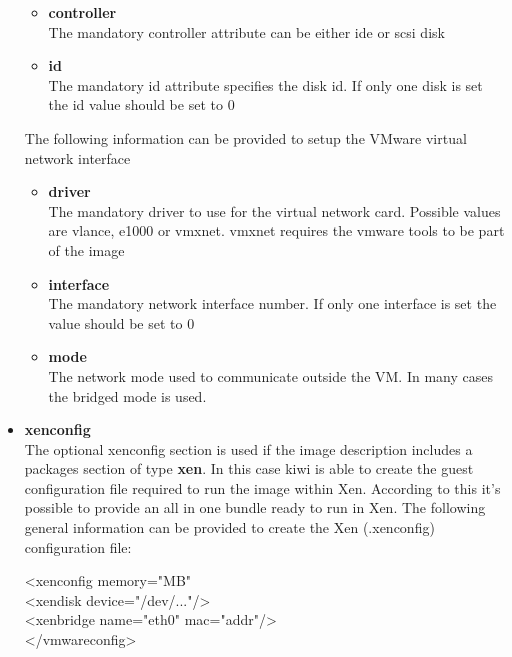 \begin{itemize}
	\begin{itemize}
	\item \textbf{controller}\\
      The mandatory controller attribute can be either ide or scsi disk
	\item \textbf{id}\\
      The mandatory id attribute specifies the disk id. If only one
      disk is set the id value should be set to 0 
	\end{itemize}

	The following information can be provided to setup the VMware virtual
	network interface

	\begin{itemize}
	\item \textbf{driver}\\
      The mandatory driver to use for the virtual network card. Possible
      values are vlance, e1000 or vmxnet. vmxnet requires the vmware tools to be
      part of the image
	\item \textbf{interface}\\
      The mandatory network interface number. If only one interface is
      set the value should be set to 0
	\item \textbf{mode}\\
      The network mode used to communicate outside the VM. In many cases
      the bridged mode is used.
	\end{itemize}

\item \textbf{xenconfig}\\
	The optional xenconfig section is used if the image description
	includes a packages section of type \textbf{xen}. In this case kiwi
	is able to create the guest configuration file required to run the
	image within Xen. According to this it's possible to provide an all
	in one bundle ready to run in Xen. The following general information
	can be provided to create the Xen (.xenconfig) configuration file:

	\begin{Command}{12cm}
	<xenconfig memory="MB"\\
	\hspace*{1cm}<xendisk device="/dev/..."/>\\
	\hspace*{1cm}<xenbridge name="eth0" mac="addr"/>\\
	</vmwareconfig>
	\end{Command}


\end{itemize}
